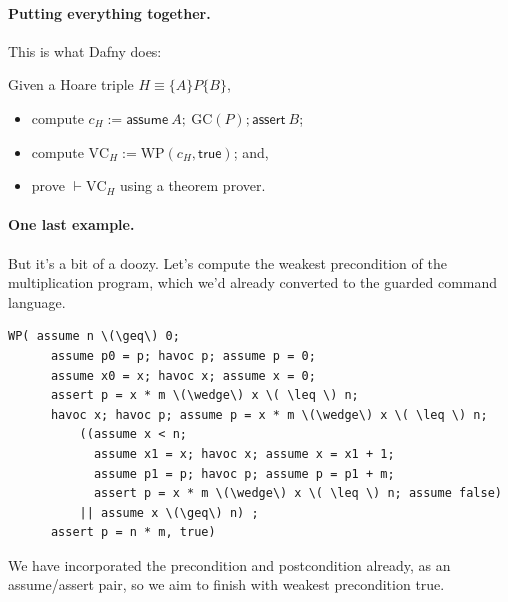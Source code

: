 \paragraph{Putting everything together.} This is what Dafny does:

Given a Hoare triple $H \equiv \{ A \} P \{ B \}$,
\begin{itemize}[noitemsep]
\item compute $c_H := \mathsf{assume~}A; ~\mathrm{GC}(P); \mathsf{assert~}B$;
\item compute $\mathrm{VC}_H := \mathrm{WP}(c_H, \mathsf{true})$; and,
\item prove $\vdash \mathrm{VC}_H$ using a theorem prover.
\end{itemize}

\paragraph{One last example.} But it's a bit of a doozy. Let's compute the weakest precondition of the multiplication program, which we'd already converted to the guarded command language.

\begin{Verbatim}[commandchars=\\\{\}]
  WP( assume n \(\geq\) 0;
      assume p0 = p; havoc p; assume p = 0; 
      assume x0 = x; havoc x; assume x = 0; 
      assert p = x * m \(\wedge\) x \( \leq \) n;
      havoc x; havoc p; assume p = x * m \(\wedge\) x \( \leq \) n;
          ((assume x < n; 
            assume x1 = x; havoc x; assume x = x1 + 1; 
            assume p1 = p; havoc p; assume p = p1 + m; 
            assert p = x * m \(\wedge\) x \( \leq \) n; assume false) 
          || assume x \(\geq\) n) ;
      assert p = n * m, true)
\end{Verbatim}
We have incorporated the precondition and postcondition already, as an assume/assert pair, so we aim to finish with weakest precondition \textsf{true}.

